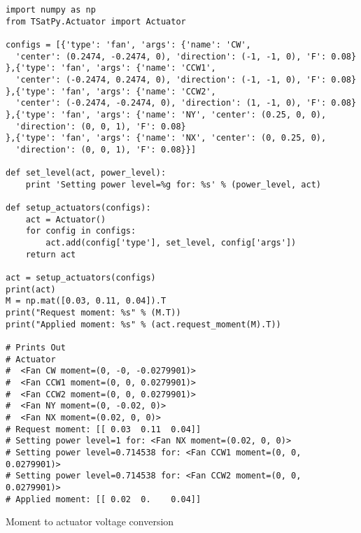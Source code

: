 \begin{listing}
\begin{singlespace}
  \begin{verbatim}
import numpy as np
from TSatPy.Actuator import Actuator

configs = [{'type': 'fan', 'args': {'name': 'CW',
  'center': (0.2474, -0.2474, 0), 'direction': (-1, -1, 0), 'F': 0.08}
},{'type': 'fan', 'args': {'name': 'CCW1',
  'center': (-0.2474, 0.2474, 0), 'direction': (-1, -1, 0), 'F': 0.08}
},{'type': 'fan', 'args': {'name': 'CCW2',
  'center': (-0.2474, -0.2474, 0), 'direction': (1, -1, 0), 'F': 0.08}
},{'type': 'fan', 'args': {'name': 'NY', 'center': (0.25, 0, 0),
  'direction': (0, 0, 1), 'F': 0.08}
},{'type': 'fan', 'args': {'name': 'NX', 'center': (0, 0.25, 0),
  'direction': (0, 0, 1), 'F': 0.08}}]

def set_level(act, power_level):
    print 'Setting power level=%g for: %s' % (power_level, act)

def setup_actuators(configs):
    act = Actuator()
    for config in configs:
        act.add(config['type'], set_level, config['args'])
    return act

act = setup_actuators(configs)
print(act)
M = np.mat([0.03, 0.11, 0.04]).T
print("Request moment: %s" % (M.T))
print("Applied moment: %s" % (act.request_moment(M).T))

# Prints Out
# Actuator
#  <Fan CW moment=(0, -0, -0.0279901)>
#  <Fan CCW1 moment=(0, 0, 0.0279901)>
#  <Fan CCW2 moment=(0, 0, 0.0279901)>
#  <Fan NY moment=(0, -0.02, 0)>
#  <Fan NX moment=(0.02, 0, 0)>
# Request moment: [[ 0.03  0.11  0.04]]
# Setting power level=1 for: <Fan NX moment=(0.02, 0, 0)>
# Setting power level=0.714538 for: <Fan CCW1 moment=(0, 0, 0.0279901)>
# Setting power level=0.714538 for: <Fan CCW2 moment=(0, 0, 0.0279901)>
# Applied moment: [[ 0.02  0.    0.04]]
  \end{verbatim}
\caption{Moment to actuator voltage conversion}
\label{code:actuator_usage}
\nocite{minted}
\end{singlespace}
\end{listing}

